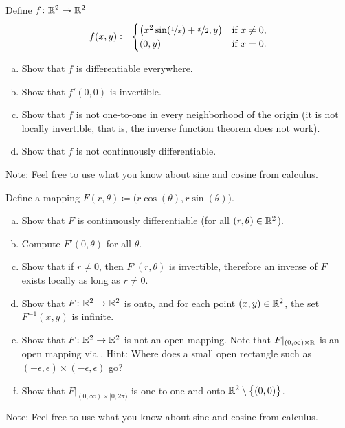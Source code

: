 \begin{samepage}
\begin{exercise}
Define $f \colon {\mathbb{R}}^2 \to {\mathbb{R}}^2$
\begin{equation*}
f(x,y) \coloneqq
\begin{cases}
\bigl(x^2 \sin (\nicefrac{1}{x}) + \nicefrac{x}{2} , y \bigr) &
 \text{if } x \neq 0, \\
(0,y) &
 \text{if } x=0.
\end{cases}
\end{equation*}
\begin{enumerate}[a)]
\item
Show that $f$ is differentiable everywhere.
\item
Show that $f'(0,0)$ is invertible.
\item
Show that $f$ is not one-to-one in every neighborhood of the origin (it is
not locally invertible, that is, the inverse function theorem does not work).
\item
Show that $f$ is not continuously differentiable.
\end{enumerate}
Note: Feel free to use what you know about sine and cosine from calculus.
\end{exercise}
\end{samepage}

\begin{exercise} \label{mv:exercise:polarcoordinates}
Define a mapping $F(r,\theta) \coloneqq \bigl(r \cos(\theta), r \sin(\theta) \bigr)$.
\begin{enumerate}[a)]
\item
Show that $F$ is continuously differentiable (for all $(r,\theta) \in
{\mathbb{R}}^2$).
\item
Compute $F'(0,\theta)$ for all $\theta$.
\item
Show that if $r \neq 0$, then $F'(r,\theta)$ is invertible, therefore an
inverse of $F$ exists locally as long as $r \neq 0$.
\item
Show that $F \colon {\mathbb{R}}^2 \to {\mathbb{R}}^2$ is onto, and for each point $(x,y) \in
{\mathbb{R}}^2$, the set $F^{-1}(x,y)$ is infinite.
\item
Show that $F \colon {\mathbb{R}}^2 \to {\mathbb{R}}^2$ is not an open mapping.
Note that $F|_{(0,\infty) \times {\mathbb{R}}}$ is an open mapping
via .
Hint: Where does a
small open rectangle such as $(-\epsilon,\epsilon) \times
(-\epsilon,\epsilon)$ go?
\item
Show that $F|_{(0,\infty) \times [0,2\pi)}$ is one-to-one and onto
${\mathbb{R}}^2 \setminus \bigl\{ (0,0) \bigr\}$.
\end{enumerate}
Note: Feel free to use what you know about sine and cosine from calculus.
\end{exercise}

